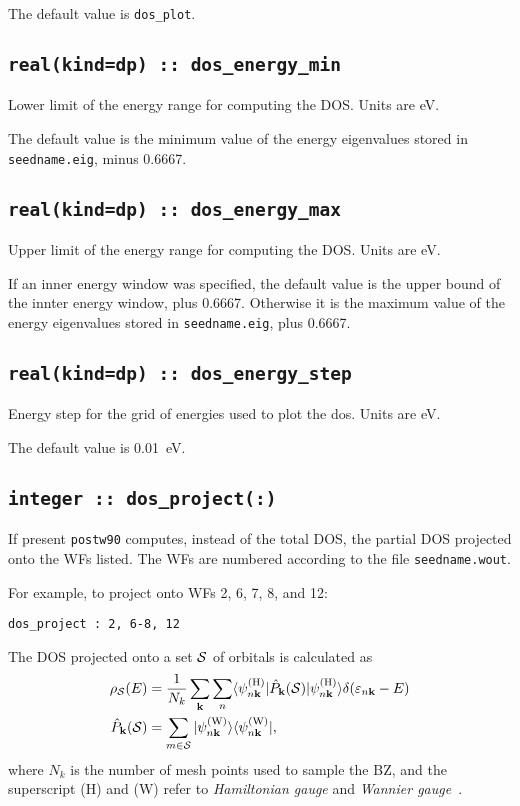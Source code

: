 The default value is \verb#dos_plot#.


\subsection[dos\_min\_energy]{\tt real(kind=dp) :: dos\_energy\_min}
Lower limit of the energy range for computing the DOS.
Units are eV.

The default value is the minimum value of the energy eigenvalues
stored in {\tt seedname.eig}, minus 0.6667.

\subsection[dos\_max\_energy]{\tt real(kind=dp) :: dos\_energy\_max}
Upper limit of the energy range for computing the DOS.
Units are eV.

If an inner energy window was specified, 
the default value is the upper bound of the innter energy window, plus 0.6667.
Otherwise it is  the maximum value of the energy eigenvalues
stored in {\tt seedname.eig}, plus 0.6667.

\subsection[dos\_energy\_step]{\tt real(kind=dp) :: dos\_energy\_step}
Energy step for the grid of energies used to plot the dos. Units are eV.

The default value is 0.01~eV.

\subsection[dos\_project]{\tt integer :: dos\_project(:)}

If present {\tt postw90} computes, instead of the total DOS, the
partial DOS projected onto the WFs listed. The WFs are numbered
according to the file {\tt seedname.wout}.

For example, to project onto WFs 2, 6, 7, 8, and 12:

{\tt dos\_project : 2, 6-8, 12}

The DOS projected onto a set ${\cal S}$ of orbitals is calculated as
%
\begin{align}
\rho_{\cal S}(E)&=\frac{1}{N_k}\sum_{\bf k}\sum_n
\langle \psi_{n\bf k}^{({\rm H})}\vert \hat{P}_{\bf k}({\cal S})\vert 
\psi_{n\bf k}^{({\rm H})}\rangle\delta(\varepsilon_{n\bf k}-E)\\
\hat{P}_{\bf k}({\cal S})&=\sum_{m\in{\cal S}}
\vert \psi_{n\bf k}^{({\rm W})}\rangle\langle \psi_{n\bf k}^{({\rm W})}\vert,
\end{align}
%
where $N_k$ is the number of mesh points used to sample the BZ, and
the superscript (H) and (W) refer to {\it Hamiltonian gauge} and {\it
  Wannier gauge}~\cite{wang-prb06}.

